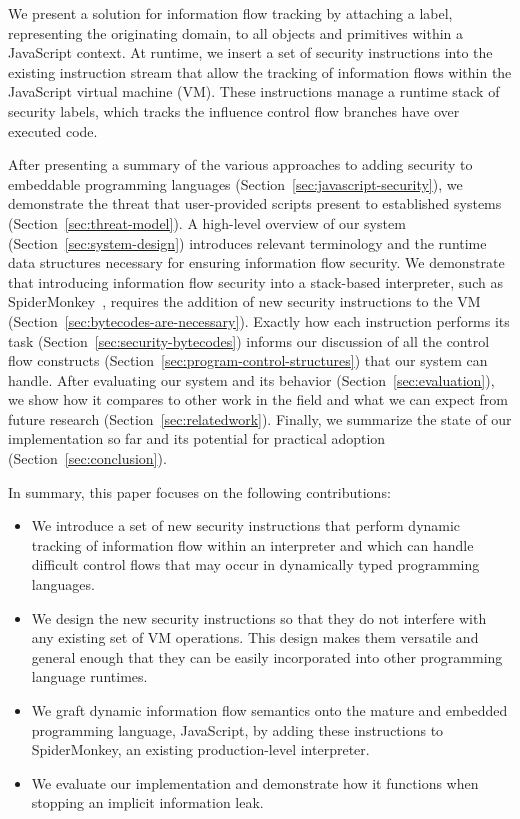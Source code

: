 \documentclass[preprint]{sigplanconf}
\begin{document}
We present a solution for information flow tracking by attaching a label, representing the originating domain, to all objects and primitives within a JavaScript context.
At runtime, we insert a set of security instructions into the existing instruction stream that allow the tracking of information flows within the JavaScript virtual machine (VM).
These instructions manage a runtime stack of security labels, which tracks the influence control flow branches have over executed code.

After presenting a summary of the various approaches to adding security to embeddable programming languages (Section~\ref{sec:javascript-security}), we demonstrate the threat that user-provided scripts present to established systems (Section~\ref{sec:threat-model}).
A high-level overview of our system (Section~\ref{sec:system-design}) introduces relevant terminology and the runtime data structures necessary for ensuring information flow security.
We demonstrate that introducing information flow security into a stack-based interpreter, such as SpiderMonkey~\cite{spidermonkey}, requires the addition of new security instructions to the VM (Section~\ref{sec:bytecodes-are-necessary}).
Exactly how each instruction performs its task (Section~\ref{sec:security-bytecodes}) informs our discussion of all the control flow constructs (Section~\ref{sec:program-control-structures}) that our system can handle.
After evaluating our system and its behavior (Section~\ref{sec:evaluation}), we show how it compares to other work in the field and what we can expect from future research (Section~\ref{sec:relatedwork}).
Finally, we summarize the state of our implementation so far and its potential for practical adoption (Section~\ref{sec:conclusion}).

In summary, this paper focuses on the following contributions:
\begin{itemize}
\item{We introduce a set of new security instructions that perform dynamic tracking of information flow within an interpreter and which can handle difficult control flows that may occur in dynamically typed programming languages.}
\item{We design the new security instructions so that they do not interfere with any existing set of VM operations. This design makes them versatile and general enough that they can be easily incorporated into other programming language runtimes.}
\item{We graft dynamic information flow semantics onto the mature and embedded programming language, JavaScript, by adding these instructions to SpiderMonkey, an existing production-level interpreter.}
\item{We evaluate our implementation and demonstrate how it functions when stopping an implicit information leak.}
\end{itemize}
\end{document}
